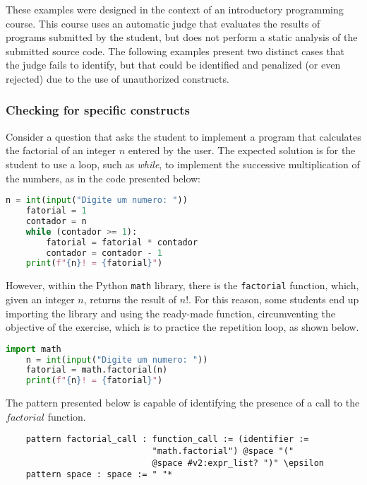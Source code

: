 These examples were designed in the context of an introductory programming course. 
This course uses an automatic judge that evaluates the results of programs 
submitted by the student, but does not perform a static analysis of the submitted 
source code. The following examples present two distinct cases that the judge 
fails to identify, but that could be identified and penalized (or even rejected) due 
to the use of unauthorized constructs.

\subsubsection{Checking for specific constructs}
    
Consider a question that asks the student to implement a program that 
calculates the factorial of an integer \(n\) entered by the user.
The expected solution is for the student to use a loop, such as \textit{while}, 
to implement the successive multiplication of the numbers, as in the code 
presented below:

\begin{lstlisting}[language=Python]
    n = int(input("Digite um numero: "))
    fatorial = 1
    contador = n
    while (contador >= 1):
        fatorial = fatorial * contador
        contador = contador - 1
    print(f"{n}! = {fatorial}")
\end{lstlisting}

However, within the Python \texttt{math} library, there is the \texttt{factorial} 
function, which, given an integer \(n\), returns the result of \(n!\).
For this reason, some students end up importing the library and using the 
ready-made function, circumventing the objective of the exercise, which is 
to practice the repetition loop, as shown below.

\begin{lstlisting}[language=Python]
    import math
    n = int(input("Digite um numero: "))
    fatorial = math.factorial(n)
    print(f"{n}! = {fatorial}")
\end{lstlisting}


The pattern presented below is capable of identifying the presence of a call 
to the \(factorial\) function.

\begin{verbatim}
    pattern factorial_call : function_call := (identifier := 
                             "math.factorial") @space "(" 
                             @space #v2:expr_list? ")" \epsilon
    pattern space : space := " "*
\end{verbatim}

